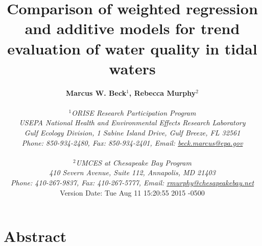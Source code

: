 \documentclass[letterpaper,12pt,oneside]{article}\usepackage[]{graphicx}\usepackage[]{color}
\begin{document}
\raggedbottom
\raggedright
{}
\setlength{\parindent}{0.5in}
\renewcommand\refname{References \vspace{12pt}}

\begin{singlespace}
\title{{\bf {\Large Comparison of weighted regression and additive models for trend evaluation of water quality in tidal waters}}}
\author{
  {\bf {\normalsize Marcus W. Beck$^1$, Rebecca Murphy$^2$}}
  \\\\{\textit {\normalsize $^1$ORISE Research Participation Program}}
  \\{\textit {\normalsize USEPA National Health and Environmental Effects Research Laboratory}}
  \\{\textit {\normalsize Gulf Ecology Division, 1 Sabine Island Drive, Gulf Breeze, FL 32561}}
	\\{\textit {\normalsize Phone: 850-934-2480, Fax: 850-934-2401, Email: \href{mailto:beck.marcus@epa.gov}{beck.marcus@epa.gov}}}
  \\\\{\textit {\normalsize $^2$UMCES at Chesapeake Bay Program}}
	\\{\textit {\normalsize 410 Severn Avenue, Suite 112, Annapolis, MD 21403}}
	\\{\textit {\normalsize Phone: 410-267-9837, Fax: 410-267-5777, Email: \href{mailto:rmurphy@chesapeakbay.net}{rmurphy@chesapeakebay.net}}}
  \vspace{1in} 
  \\ Version Date:   Tue Aug 11 15:20:55 2015 -0500
	}
\date{}
\maketitle
\end{singlespace}
\clearpage

\section*{Abstract}
\end{document}
